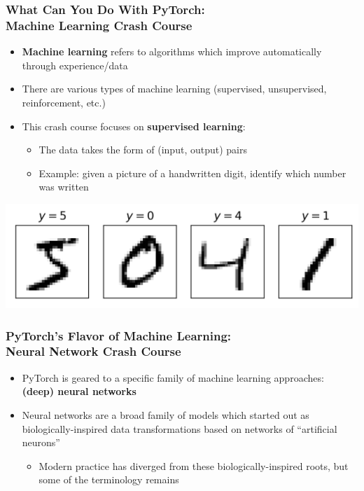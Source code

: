 \documentclass[xcolor={x11names,table}]{beamer}
\begin{document}
\begin{frame}
	\frametitle{What Can You Do With PyTorch:\\Machine Learning Crash Course}
	\begin{itemize}
		\item \textbf{Machine learning} refers to algorithms which improve automatically through experience/data
		\item There are various types of machine learning (supervised, unsupervised, reinforcement, etc.)
		\item This crash course focuses on \textbf{supervised learning}:
		\begin{itemize}
			\item The data takes the form of (input, output) pairs
			\item Example: given a picture of a handwritten digit, identify which number was written
		\end{itemize}
	\end{itemize}
	\begin{center}
		\includegraphics[width=\textwidth]{mnist}
	\end{center}
\end{frame}

\begin{frame}
	\frametitle{PyTorch's Flavor of Machine Learning:\\Neural Network Crash Course}

	\begin{itemize}
		\item PyTorch is geared to a specific family of machine learning approaches: \textbf{(deep) neural networks}
		\item Neural networks are a broad family of models which started out as biologically-inspired data transformations based on networks of ``artificial neurons''
		\begin{itemize}
			\item Modern practice has diverged from these biologically-inspired roots, but some of the terminology remains
		\end{itemize}
	\end{itemize}
\end{frame}
\end{document}
